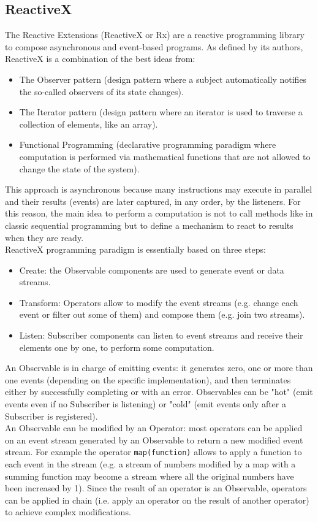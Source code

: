 \documentclass[11pt,a4paper,notitlepage]{article}
\begin{document}
\subsection{ReactiveX}
The Reactive Extensions (ReactiveX or Rx) are a reactive programming library to compose asynchronous and event-based programs. As defined by its authors, ReactiveX is a combination of the best ideas from:
\begin{itemize}
	\item The Observer pattern (design pattern where a subject automatically notifies the so-called observers of its state changes).
	\item The Iterator pattern (design pattern where an iterator is used to traverse a collection of elements, like an array).
	\item Functional Programming (declarative programming paradigm where computation is performed via mathematical functions that are not allowed to change the state of the system).
\end{itemize}
This approach is asynchronous because many instructions may execute in parallel and their results (events) are later captured, in any order, by the listeners. For this reason, the main idea to perform a computation is not to call methods like in classic sequential programming but to define a mechanism to react to results when they are ready.\bigskip \\
ReactiveX programming paradigm is essentially based on three steps:
\begin{itemize}
	\item Create: the Observable components are used to generate event or data streams.
	\item Transform: Operators allow to modify the event streams (e.g. change each event or filter out some of them) and compose them (e.g. join two streams).
	\item Listen: Subscriber components can listen to event streams and receive their elements one by one, to perform some computation.
\end{itemize}
An Observable is in charge of emitting events: it generates zero, one or more than one events (depending on the specific implementation), and then terminates either by successfully completing or with an error. Observables can be "hot" (emit events even if no Subscriber is listening) or "cold" (emit events only after a Subscriber is registered).\medskip \\
An Observable can be modified by an Operator: most operators can be applied on an event stream generated by an Observable to return a new modified event stream. For example the operator \texttt{map(function)} allows to apply a function to each event in the stream (e.g. a stream of numbers modified by a map with a summing function may become a stream where all the original numbers have been increased by 1). Since the result of an operator is an Observable, operators can be applied in chain (i.e. apply an operator on the result of another operator) to achieve complex modifications.\medskip \\
\end{document}
